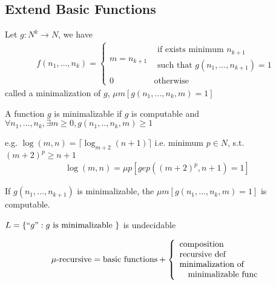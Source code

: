 \subsection{Extend Basic Functions}
\begin{definition}[minimalization]
    Let $g:N^k\to N$, we have
    {\small
    \begin{align*}
        f(n_1,\dots,n_k)=\left\{ \begin{array}{ll}
            m=n_{k+1} & \begin{array}{l}
                \text{if exists minimum } n_{k+1}\\
                \text{such that }g(n_1,\dots,n_{k+1})=1
            \end{array}\\
            0 & \text{otherwise}
        \end{array} \right.
    \end{align*}
    }
    called a minimalization of $g$, $\mu m[g(n_1,\dots,n_k,m)=1]$
\end{definition}

\begin{theorem}
    A function $g$ is minimalizable if $g$ is computable and $\forall n_1,\dots,n_k, \exists m\ge 0, g(n_1,..   ,n_k,m)\ge 1$
\end{theorem}

e.g. $\log(m,n)=\lceil \log_{m+2}(n+1)\rceil$ i.e. minimum $p\in N$, s.t. $(m+2)^p\ge n+1$
\begin{align*}
    \log(m,n)=\mu p \left[gep((m+2)^p, n+1)=1\right]
\end{align*}

\begin{theorem}
    If $g(n_1,\dots,n_{k+1})$ is minimalizable, the $\mu m[g(n_1,\dots,n_k,m)=1]$ is computable. 
\end{theorem}

\begin{theorem}
    $L=\{{``g"}: g\text{ is minimalizable }\}$ is undecidable
\end{theorem}

\begin{definition}[$\mu$-recursive]
    \begin{align*}
        \mu\text{-recursive}=\text{basic functions} + \left\{ \begin{array}{l}
            \text{composition}\\
            \text{recursive def}\\
            \text{minimalization of}\\
            \text{\quad minimalizable  func}
        \end{array} \right.
    \end{align*}
\end{definition}


